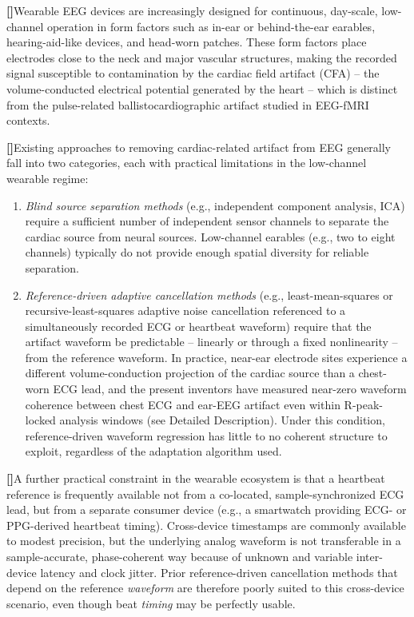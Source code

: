 \documentclass[12pt]{article}
\newcounter{para}
\newcommand{\parnum}{\stepcounter{para}\noindent\textbf{[\thepara]}\quad}
\begin{document}
\parnum Wearable EEG devices are increasingly designed for continuous, day-scale, low-channel operation in form factors such as in-ear or behind-the-ear earables, hearing-aid-like devices, and head-worn patches. These form factors place electrodes close to the neck and major vascular structures, making the recorded signal susceptible to contamination by the cardiac field artifact (CFA) -- the volume-conducted electrical potential generated by the heart -- which is distinct from the pulse-related ballistocardiographic artifact studied in EEG-fMRI contexts.

\parnum Existing approaches to removing cardiac-related artifact from EEG generally fall into two categories, each with practical limitations in the low-channel wearable regime:

\begin{enumerate}[label=(\alph*)]
\item \emph{Blind source separation methods} (e.g., independent component analysis, ICA) require a sufficient number of independent sensor channels to separate the cardiac source from neural sources. Low-channel earables (e.g., two to eight channels) typically do not provide enough spatial diversity for reliable separation.
\item \emph{Reference-driven adaptive cancellation methods} (e.g., least-mean-squares or recursive-least-squares adaptive noise cancellation referenced to a simultaneously recorded ECG or heartbeat waveform) require that the artifact waveform be predictable -- linearly or through a fixed nonlinearity -- from the reference waveform. In practice, near-ear electrode sites experience a different volume-conduction projection of the cardiac source than a chest-worn ECG lead, and the present inventors have measured near-zero waveform coherence between chest ECG and ear-EEG artifact even within R-peak-locked analysis windows (see Detailed Description). Under this condition, reference-driven waveform regression has little to no coherent structure to exploit, regardless of the adaptation algorithm used.
\end{enumerate}

\parnum A further practical constraint in the wearable ecosystem is that a heartbeat reference is frequently available not from a co-located, sample-synchronized ECG lead, but from a separate consumer device (e.g., a smartwatch providing ECG- or PPG-derived heartbeat timing). Cross-device timestamps are commonly available to modest precision, but the underlying analog waveform is not transferable in a sample-accurate, phase-coherent way because of unknown and variable inter-device latency and clock jitter. Prior reference-driven cancellation methods that depend on the reference \emph{waveform} are therefore poorly suited to this cross-device scenario, even though beat \emph{timing} may be perfectly usable.
\end{document}
